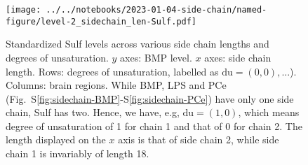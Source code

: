 \documentclass[letterpaper]{article}
\begin{document}
\begin{figure}[p]
	\texttt{[image: ../../notebooks/2023-01-04-side-chain/named-figure/level-2\_sidechain\_len-Sulf.pdf]}
	\caption[Sulf levels across various side chain lengths and degrees of unsaturation]{
		Standardized Sulf levels across various side chain lengths and degrees of unsaturation.
		$y$ axes: BMP level. $x$ axes: side chain length. Rows: 
		degrees of unsaturation, labelled as $\mathrm{du} = (0,0), ...$). Columns:
		brain regions.
	While BMP, LPS and PCe
	(Fig.~S\ref{fig:sidechain-BMP}-S\ref{fig:sidechain-PCe}) have only one side
	chain, Sulf has two.  Hence, we have, e.g, $\mathrm{du} = (1,0)$, which means
	degree of unsaturation of 1 for chain 1 and that of 0 for chain 2.  The
	length displayed on the $x$ axis is that of side chain 2, while side chain 1
	is invariably of length 18.
}
\label{fig:sidechain-Sulf}
\end{figure}
\end{document}
